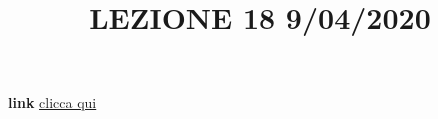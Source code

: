\newline
\newline
\title{LEZIONE 18 9/04/2020}\newline
\textbf{link} \href{https://web.microsoftstream.com/video/a6351498-1edd-4ec9-b134-3b5fd7a9a3ee?list=user&userId=faa91214-a6f5-40d7-8875-253fd49b8ce1}{clicca qui}